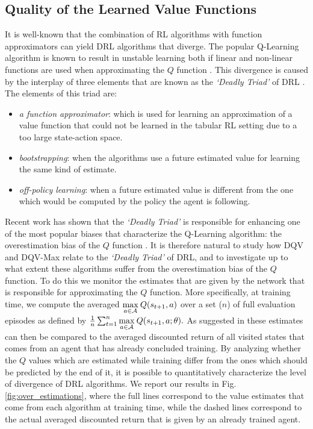 
\subsection{Quality of the Learned Value Functions}
\label{sec:quality_of_value_functions}

It is well-known that the combination of RL algorithms with function approximators can yield DRL algorithms that diverge. The popular Q-Learning algorithm is known to result in unstable learning both if linear \cite{tsitsiklis1997analysis} and non-linear functions are used when approximating the $Q$ function \cite{van2018deep}. This divergence is caused by the interplay of three elements that are known as the \textit{`Deadly Triad'} of DRL \cite{sutton2018reinforcement}. The elements of this triad are:
\begin{itemize}
    \item \textit{a function approximator}: which is used for learning an approximation of a value function that could not be learned in the tabular RL setting due to a too large state-action space.
    \item \textit{bootstrapping}: when the algorithms use a future estimated value for learning the same kind of estimate.
    \item \textit{off-policy learning}: when a future estimated value is different from the one which would be computed by the policy the agent is following.
\end{itemize}{}

Recent work \cite{van2018deep} has shown that the \textit{`Deadly Triad'} is responsible for enhancing one of the most popular biases that characterize the Q-Learning algorithm: the overestimation bias of the $Q$ function \cite{hasselt2010double}. It is therefore natural to study how DQV and DQV-Max relate to the \textit{`Deadly Triad'} of DRL, and to investigate up to what extent these algorithms suffer from the overestimation bias of the $Q$ function. To do this we monitor the estimates that are given by the network that is responsible for approximating the $Q$ function. More specifically, at training time, we compute the averaged $\underset{a \in \cal A}{\max}\:Q(s_{t+1}, a)$ over a set ($n$) of full evaluation episodes as defined by $\frac{1}{n}\sum_{t=1}^{n}\underset{a \in \cal A}{\max}\:Q(s_{t+1}, a;\theta).$ As suggested in \cite{van2016deep} these estimates can then be compared to the averaged discounted return of all visited states that comes from an agent that has already concluded training. By analyzing whether the $Q$ values which are estimated while training differ from the ones which should be predicted by the end of it, it is possible to quantitatively characterize the level of divergence of DRL algorithms. We report our results in Fig. \ref{fig:over_estimations}, where the full lines correspond to the value estimates that come from each algorithm at training time, while the dashed lines correspond to the actual averaged discounted return that is given by an already trained agent.

